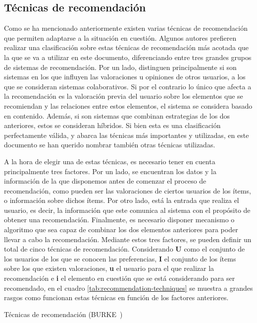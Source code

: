 \subsection{Técnicas de recomendación}
\label{sec:tecnicas-recomendacion}
Como se ha mencionado anteriormente existen varias técnicas de recomendación que permiten adaptarse a la situación en cuestión. Algunos autores prefieren realizar una clasificación sobre estas técnicas de recomendación más acotada que la que se va a utilizar en este documento\cite{Balabanovic:1997:FCC:245108.245124}, diferenciando entre tres grandes grupos de sistemas de recomendación. Por un lado, distinguen principalmente si son sistemas en los que influyen las valoraciones u opiniones de otros usuarios, a los que se consideran sistemas colaborativos. Si por el contrario lo único que afecta a la recomendación es la valoración previa del usuario sobre los elementos que se recomiendan y las relaciones entre estos elementos, el sistema se considera basado en contenido. Además, si son sistemas que combinan estrategias de los dos anteriores, estos se consideran híbridos. Si bien esta es una clasificación perfectamente válida, y abarca las técnicas más importantes y utilizadas, en este documento se han querido nombrar también otras técnicas utilizadas.


A la hora de elegir una de estas técnicas, es necesario tener en cuenta principalmente tres factores. Por un lado, se encuentran los datos y la información de la que disponemos antes de comenzar el proceso de recomendación, como pueden ser las valoraciones de ciertos usuarios de los ítems, o información sobre dichos ítems. Por otro lado, está la entrada que realiza el usuario, es decir, la información que este comunica al sistema con el propósito de obtener una recomendación. Finalmente, es necesario disponer mecanismo o algoritmo que sea capaz de combinar los dos elementos anteriores para poder llevar a cabo la recomendación. Mediante estos tres factores, se pueden definir un total de cinco técnicas de recomendación. Considerando \textbf{U} como el conjunto de los usuarios de los que se conocen las preferencias, \textbf{I} el conjunto de los ítems sobre los que existen valoraciones, \textbf{u} el usuario para el que realizar la recomendación e \textbf{i} el elemento en cuestión que se está considerando para ser recomendado, en el cuadro \ref{tab:recommendation-techniques} se muestra a grandes rasgos como funcionan estas técnicas en función de los factores anteriores. 


\begin{table}[hp]
  \centering
  {\small
  
  }
  \caption[Técnicas de recomendación]
  {Técnicas de recomendación
    (\textsc{BURKE}~\cite{Burke})}
  \label{tab:recommendation-techniques}
\end{table}

